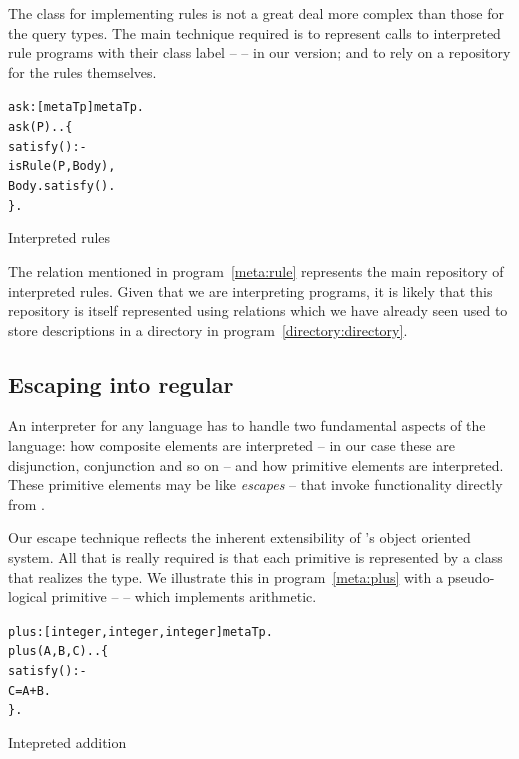 The class for implementing rules is not a great deal more complex than those for the query types. The main technique required is to represent calls to interpreted rule programs with their class label --  -- in our version; and to rely on a repository for the rules themselves.
\begin{program}
\vspace{0.5ex}
\begin{alltt}
ask:[metaTp]\conarrow{}metaTp.
ask(P)..\{
  satisfy() :-
    isRule(P,Body),
    Body.satisfy().
\}.
\end{alltt}
\vspace{-2ex}
\caption{Interpreted rules}
\label{meta:rule}
\end{program}
The  relation mentioned in program~\vref{meta:rule} represents the main repository of interpreted rules. Given that we are interpreting programs, it is likely that this repository is itself represented using  relations which we have already seen used to store descriptions in a directory in program~\vref{directory:directory}. 

\subsection{Escaping into regular \go}
An interpreter for any language has to handle two fundamental aspects of the language: how composite elements are interpreted -- in our case these are disjunction, conjunction and so on -- and how primitive elements are interpreted. These primitive elements may be like \emph{escapes} -- that invoke functionality directly from \go.

Our escape technique reflects the inherent extensibility of \go's object oriented system. All that is really required is that each primitive is represented by a class that realizes the  type. We illustrate this in program~\vref{meta:plus} with a pseudo-logical primitive --  -- which implements arithmetic.
\begin{program}
\vspace{0.5ex}
\begin{alltt}
plus:[integer, integer, integer]\conarrow{}metaTp.
plus(A,B,C)..\{
  satisfy() :-
    C = A+B.
\}.
\end{alltt}
\vspace{-2ex}
\caption{Intepreted addition}
\label{meta:plus}
\end{program}

